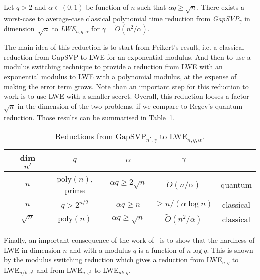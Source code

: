 \begin{theorem}
Let $q >2$ and $\alpha \in (0,1)$ be function of $n$ such that $\alpha q \geq \sqrt{n}$. There exists a worst-case to average-case classical polynomial time reduction from \emph{GapSVP}$_{\gamma}$ in dimension~$\sqrt{n}$ to \emph{LWE}$_{n,q,\alpha}$ for $\gamma = \tilde{O}(n^2/\alpha)$. 
\end{theorem}

The main idea of this reduction is to start from Peikert's result, i.e. a classical reduction from GapSVP to LWE for an exponential modulus. And then to use a modulus switching technique to provide a reduction from LWE with an exponential modulus to LWE with a polynomial modulus, at the expense of making the error term grows. 
 Note than an important step for this reduction to work is to use LWE with a smaller secret.
Overall, this reduction looses a factor $\sqrt{n}$ in the dimension of the two problems, if we compare to Regev's quantum reduction.
Those results can be summarised in Table~\ref{tab:LWE}.

\begin{table}[h]
\begin{center}
\begin{tabular}{c|c|c|c|c|c}
& dim $n'$ & $q$ & $\alpha$ & $\gamma$ & \\
\hline
\cite{Reg05} & $n$ & $\text{poly}(n)$, prime  & $\alpha q \geq 2\sqrt{n}$& $\tilde{O}(n/\alpha)$ & quantum \\[0.3em]
\cite{Pei09} & $n$ & $q> 2^{n/2}$ & $\alpha q \geq n$ & $ \geq n /(\alpha \log n)$ & classical \\[0.3em]
\cite{BLPRS13} & $\sqrt{n}$ & $\text{poly}(n)$ & $\alpha q \geq \sqrt{n}$ & $\tilde{O}(n^2/\alpha)$ & classical \\
\end{tabular}
\caption{Reductions from GapSVP$_{n', \gamma}$ to LWE$_{n,q,\alpha}$.}
\label{tab:LWE}
\end{center}
\end{table}

Finally, an important consequence of the work of~\cite{BLPRS13} is to show that the hardness of LWE in dimension $n$ and with a modulus $q$ is a function of $n \log q$. This is shown by the modulus switching reduction which gives a reduction from LWE$_{n,q}$ to LWE$_{n/k,q^k}$ and from LWE$_{n,q^k}$ to LWE$_{nk,q}$.







